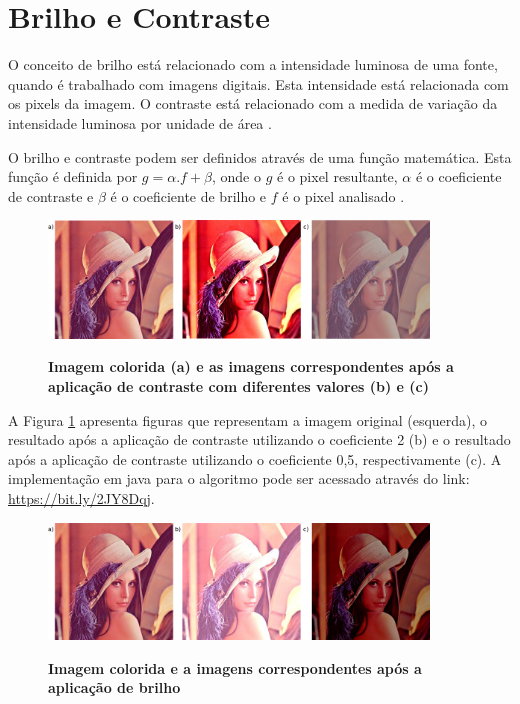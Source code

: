 \documentclass[
	12pt,				%
	oneside,			%
	a4paper,			%
	english,			%
	french,				%
	spanish,			%
	brazil,				%
	]{abntex2}
\begin{document}
\section{Brilho e Contraste}
O conceito de brilho está relacionado com a intensidade luminosa de uma fonte, quando é trabalhado com imagens digitais. Esta intensidade está relacionada com os pixels da imagem. O contraste está relacionado com a medida de variação da intensidade luminosa por unidade de área \cite{gonzalesWoods:2008}.

O brilho e contraste podem ser definidos através de uma função matemática. Esta função é definida por \(g = \alpha.f + \beta\), onde o \(g\) é o pixel resultante, \(\alpha\) é o coeficiente de contraste e \(\beta\) é o coeficiente de brilho e \(f\) é o pixel analisado \cite{pedriniSchwartz:2008}.

\begin{figure}[ht]
\centering
\caption{\textbf{Imagem colorida (a) e as imagens correspondentes após a aplicação de contraste com diferentes valores (b) e (c)}}
\includegraphics[width=0.9\textwidth]{imagens/contraste.png}
\sourceAuthor
\label{fig:contraste}
\end{figure}

A Figura \ref{fig:contraste} apresenta figuras que representam a imagem original (esquerda), o resultado após a aplicação de contraste utilizando o coeficiente 2 (b) e o resultado após a aplicação de contraste utilizando o coeficiente 0,5, respectivamente (c). A implementação em java para o algoritmo pode ser acessado através do link: \url{https://bit.ly/2JY8Dqj}.

\begin{figure}[ht]
\centering
\caption{\textbf{Imagem colorida e a imagens correspondentes após a aplicação de brilho}}
\includegraphics[width=0.9\textwidth]{imagens/brilho.png}
\sourceAuthor
\label{fig:brilho}
\end{figure}
\end{document}

